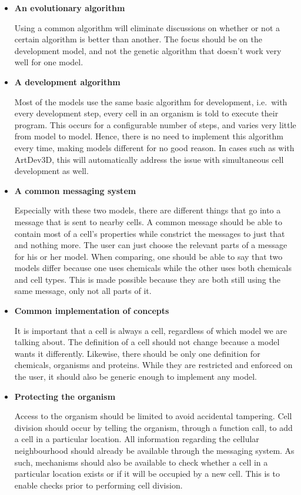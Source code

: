\begin{itemize}
	\item\textbf{An evolutionary algorithm}

	Using a common algorithm will eliminate discussions on whether or not a certain algorithm is better than another. The focus should be on the development model, and not the genetic algorithm that doesn't work very well for one model.

	\item\textbf{A development algorithm}

	Most of the models use the same basic algorithm for development, i.e.\ with every development step, every cell in an organism is told to execute their program. This occurs for a configurable number of steps, and varies very little from model to model. Hence, there is no need to implement this algorithm every time, making models different for no good reason. In cases such as with ArtDev3D, this will automatically address the issue with simultaneous cell development as well.

	\item\textbf{A common messaging system}

	Especially with these two models, there are different things that go into a message that is sent to nearby cells. A common message should be able to contain most of a cell's properties while constrict the messages to just that and nothing more. The user can just choose the relevant parts of a message for his or her model. When comparing, one should be able to say that two models differ because one uses chemicals while the other uses both chemicals and cell types. This is made possible because they are both still using the same message, only not all parts of it.

	\item\textbf{Common implementation of concepts}

	It is important that a cell is always a cell, regardless of which model we are talking about. The definition of a cell should not change because a model wants it differently. Likewise, there should be only one definition for chemicals, organisms and proteins. While they are restricted and enforced on the user, it should also be generic enough to implement any model.

	\item\textbf{Protecting the organism}

	Access to the organism should be limited to avoid accidental tampering. Cell division should occur by telling the organism, through a function call, to add a cell in a particular location. All information regarding the cellular neighbourhood should already be available through the messaging system. As such, mechanisms should also be available to check whether a cell in a particular location exists or if it will be occupied by a new cell. This is to enable checks prior to performing cell division.
\end{itemize}

